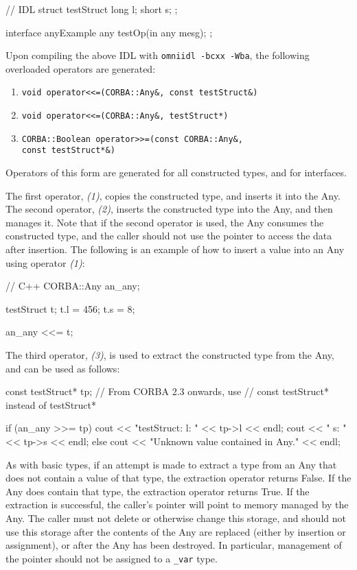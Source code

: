\documentclass[11pt,twoside,a4paper]{book}
\newcommand{\type}[1]{\texttt{#1}}
\begin{document}
\begin{idllisting}
// IDL
struct testStruct {
  long l;
  short s;
};

interface anyExample {
  any testOp(in any mesg);
};
\end{idllisting}

Upon compiling the above IDL with \texttt{omniidl -bcxx -Wba}, the
following overloaded operators are generated:

\begin{enumerate}
\item \verb|void operator<<=(CORBA::Any&, const testStruct&)|
\item \verb|void operator<<=(CORBA::Any&, testStruct*)|
\item \verb|CORBA::Boolean operator>>=(const CORBA::Any&,|\\
      \verb|const testStruct*&)|
\end{enumerate}

Operators of this form are generated for all constructed types, and
for interfaces.

The first operator, \emph{(1)}, copies the constructed type, and
inserts it into the Any. The second operator, \emph{(2)}, inserts the
constructed type into the Any, and then manages it. Note that if the
second operator is used, the Any consumes the constructed type, and
the caller should not use the pointer to access the data after
insertion. The following is an example of how to insert a value into
an Any using operator \emph{(1)}:

\begin{cxxlisting}
// C++
CORBA::Any an_any;

testStruct t;
t.l = 456;
t.s = 8;

an_any <<= t;
\end{cxxlisting}


The third operator, \emph{(3)}, is used to extract the constructed
type from the Any, and can be used as follows:

\begin{cxxlisting}
const testStruct* tp;   // From CORBA 2.3 onwards, use 
                        // const testStruct* instead of testStruct*

if (an_any >>= tp) {
    cout << "testStruct: l: " << tp->l << endl;
    cout << "            s: " << tp->s << endl;
}
else {
    cout << "Unknown value contained in Any." << endl;
}
\end{cxxlisting}

As with basic types, if an attempt is made to extract a type from an
Any that does not contain a value of that type, the extraction
operator returns False. If the Any does contain that type, the
extraction operator returns True. If the extraction is successful, the
caller's pointer will point to memory managed by the Any. The caller
must not delete or otherwise change this storage, and should not use
this storage after the contents of the Any are replaced (either by
insertion or assignment), or after the Any has been destroyed. In
particular, management of the pointer should not be assigned to a
\type{\_var} type.
\end{document}
